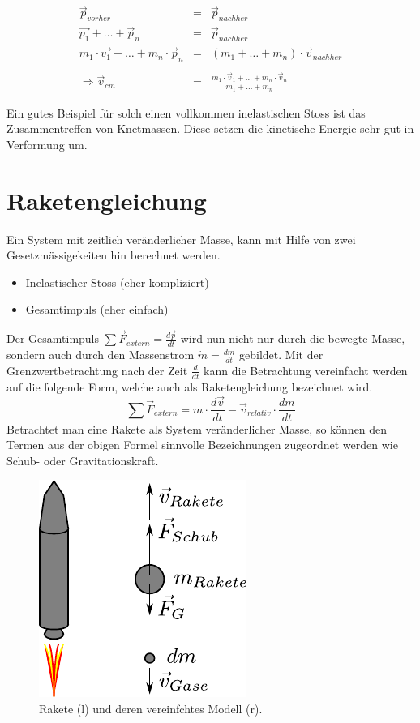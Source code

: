 \[ \boxed{
	\begin{array}{rcl}
		\vec{p}_{vorher} &= & \vec{p}_{nachher} \\
		\vec{p_1} + \dots + \vec{p}_n &= &\vec{p}_{nachher} \\
		m_1 \cdot \vec{v_1} + \dots + m_n \cdot \vec{p}_n&= 
			& (m_1 + \dots + m_n)\cdot \vec{v}_{nachher} \\
		 & & \\
		\Rightarrow \vec{v}_{cm} & = & \displaystyle 
			\frac{m_1\cdot\vec{v}_1+\dots+m_n\cdot\vec{v}_n}
				{m_1 + \dots + m_n}
	\end{array}
} \]

\noindent
Ein gutes Beispiel für solch einen vollkommen inelastischen Stoss ist
das Zusammentreffen von Knetmassen. Diese setzen die kinetische Energie
sehr gut in Verformung um.

\section{Raketengleichung}\label{sec:raketengleichung}
Ein System mit zeitlich veränderlicher Masse, kann mit Hilfe von zwei
Gesetzmässigekeiten hin berechnet werden.
\begin{itemize}
	\item Inelastischer Stoss (eher kompliziert)
	\item Gesamtimpuls (eher einfach)
\end{itemize}
Der Gesamtimpuls $\sum \vec{F}_{extern} = \frac{d\vec{p}}{dt}$ wird nun
nicht nur durch die bewegte Masse, sondern auch durch den Massenstrom 
$\dot{m}=\frac{dm}{dt}$ gebildet. 
Mit der Grenzwertbetrachtung nach der Zeit $\frac{d}{dt}$ kann die
Betrachtung vereinfacht werden auf die folgende Form, welche auch
als Raketengleichung bezeichnet wird.
\[  \boxed{
	\sum \vec{F}_{extern} 
		= m \cdot \frac{d\vec{v}}{dt} 
		- \vec{v}_{relativ} \cdot \frac{dm}{dt}
	} \]
Betrachtet man eine Rakete als System veränderlicher Masse, so können 
den Termen aus der obigen Formel sinnvolle Bezeichnungen zugeordnet 
werden wie Schub- oder Gravitationskraft.
\begin{figure}[h!]
	\centering
	\includegraphics[scale=0.8]{rakete.pdf}
	\caption{Rakete (l) und deren vereinfchtes Modell (r).}
	\label{fig:rakete}
\end{figure}

